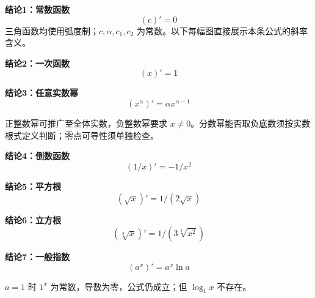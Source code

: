 \begin{statementbox}
\begin{minipage}{\linewidth}
\textbf{结论1：常数函数}
\[
(c)'=0
\]
三角函数均使用弧度制；$c,\alpha,c_1,c_2$ 为常数。以下每幅图直接展示本条公式的斜率含义。

\end{minipage}
\end{statementbox}

\begin{statementbox}
\begin{minipage}{\linewidth}
\textbf{结论2：一次函数}
\[
(x)'=1
\]

\end{minipage}
\end{statementbox}

\begin{statementbox}
\begin{minipage}{\linewidth}
\textbf{结论3：任意实数幂}
\[
(x^\alpha)'=\alpha x^{\alpha-1}
\]

\end{minipage}
正整数幂可推广至全体实数，负整数幂要求 $x\ne0$。分数幂能否取负底数须按实数根式定义判断；零点可导性须单独检查。
\end{statementbox}

\begin{statementbox}
\begin{minipage}{\linewidth}
\textbf{结论4：倒数函数}
\[
(1/x)'=-1/x^2
\]

\end{minipage}
\end{statementbox}

\begin{statementbox}
\begin{minipage}{\linewidth}
\textbf{结论5：平方根}
\[
(\sqrt x)'=1/(2\sqrt x)
\]

\end{minipage}
\end{statementbox}

\begin{statementbox}
\begin{minipage}{\linewidth}
\textbf{结论6：立方根}
\[
(\sqrt[3]x)'=1/(3\sqrt[3]{x^2})
\]

\end{minipage}
\end{statementbox}

\begin{statementbox}
\begin{minipage}{\linewidth}
\textbf{结论7：一般指数}
\[
(a^x)'=a^x\ln a
\]

\end{minipage}
$a=1$ 时 $1^x$ 为常数，导数为零，公式仍成立；但 $\log_1x$ 不存在。
\end{statementbox}

